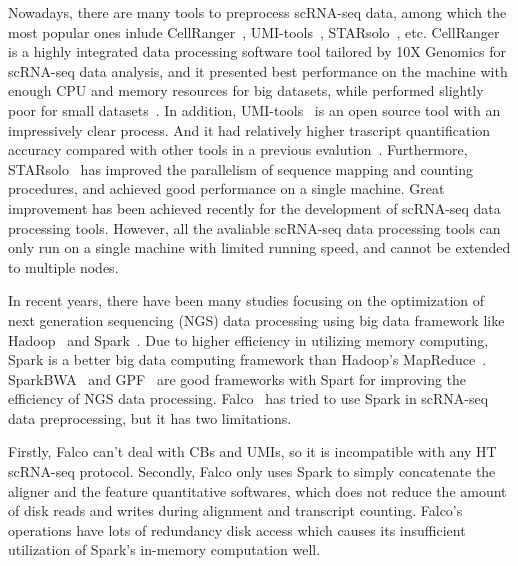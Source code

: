 \documentclass[10pt,journal,compsoc]{IEEEtran}
\begin{document}
Nowadays, there are many tools to preprocess scRNA-seq data, among which the most popular ones inlude CellRanger~\cite{Zheng2017Massively}, UMI-tools~\cite{Smith2017UMItools},  STARsolo~\cite{Blibaum2019STARsolo}, etc. 
CellRanger is a highly integrated data processing software tool tailored by 10X Genomics for scRNA-seq data analysis, and it presented best performance on the machine with enough CPU and memory resources for big datasets, while performed slightly poor for small datasets~\cite{Gao2020Comparison}. 
In addition, UMI-tools~\cite{ref_url1} is an open source tool with an impressively clear process. And it had relatively higher trascript quantification accuracy compared with other tools in a previous evalution~\cite{Gao2020Comparison}. 
Furthermore, STARsolo~\cite{Blibaum2019STARsolo} has improved the parallelism of sequence mapping and counting procedures, and achieved good performance on a single machine.
Great improvement has been achieved recently for the development of scRNA-seq data processing tools. However, all the avaliable scRNA-seq data processing tools can only run on a single machine with limited running speed, and cannot be extended to multiple nodes.

In recent years, there have been many studies focusing on the optimization of next generation sequencing (NGS) data processing using big data framework like Hadoop~\cite{ref_url2} and Spark~\cite{ref_url3}. 
Due to higher efficiency in utilizing memory computing, Spark is a better big data computing framework than Hadoop's MapReduce~\cite{Dean2008MapReduce, Zaharia2012Resilient}. 
SparkBWA~\cite{Abun2016SparkBWA} and GPF~\cite{Li2018Highperformance} are good frameworks with Spart for improving the efficiency of NGS data processing. 
Falco~\cite{Yang2017Falco} has tried to use Spark in scRNA-seq data preprocessing, but it has two limitations. 

Firstly, Falco can't deal with CBs and UMIs, so it is incompatible with any HT scRNA-seq protocol.
Secondly, Falco only uses Spark to simply concatenate the aligner and the feature quantitative softwares, which does not reduce the amount of disk reads and writes during alignment and transcript counting.
Falco’s operations have lots of redundancy disk access which causes its insufficient utilization of Spark’s in-memory computation well. 
\end{document}

